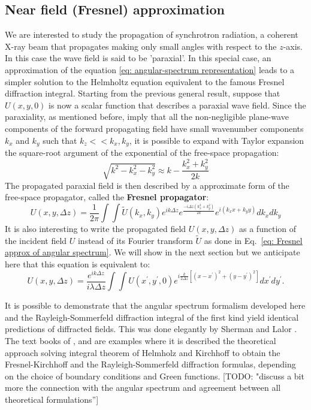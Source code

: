 \documentclass{iucr}              %
\newcommand{\todo}[1]{{\color{red}[TODO: "#1'']}}
\begin{document}
\subsection{Near field (Fresnel) approximation}

We are interested to study the propagation of synchrotron radiation, a coherent X-ray beam that propagates making only small angles with respect to the $z$-axis. In this case the wave field is said to be 'paraxial'. In this special case, an approximation of the equation \ref{eq: angular-spectrum representation} leads to a simpler solution to the Helmholtz equation equivalent to the famous Fresnel diffraction integral. Starting from the previous general result, suppose that $U(x,y,0)$ is now a scalar function that describes a paraxial wave field. Since the paraxiality, as mentioned before, imply that all the non-negligible plane-wave components of the forward propagating field have small wavenumber components $k_x$ and $k_y$ such that $k_z << k_x, k_y$, it is possible to expand with Taylor expansion the square-root argument of the exponential of the free-space propagation:
\begin{equation}\label{eq: binomial approx}
\sqrt{k^2 -k_x^2-k_y^2}\approx k -\frac{k_x^2+k_y^2}{2k}	
\end{equation}
The propagated paraxial field is then described by a approximate form of the free-space propagator, called the \textbf{Fresnel propagator}:
\begin{equation}\label{eq: Fresnel approx of angular spectrum}
U(x, y, \Delta z) = \frac {1}{ 2 \pi}\int \int \widetilde{U}(k_x, k_y) e^{i k \Delta z} e^{\frac{-i \Delta z (k_x^2 + k_y^2) }{2k}} e^{i(k_x x + k_y y)}dk_x dk_y
\end{equation}
It is also interesting to write the propagated field $U(x,y,\Delta z)$ as a function of the incident field $U$ instead of its Fourier transform $\widetilde{U}$ as done in Eq.~\ref{eq: Fresnel approx of angular spectrum}. We will show in the next section but we anticipate here that this equation is equivalent to: 
\begin{equation}\label{eq: usualfresnel}
\boxed{
U(x,y, \Delta z) = \frac {e^{i k\Delta z }}{ i \lambda \Delta z} \int  \int U(x^\prime, y^\prime, 0) e^{i \frac{k}{2 \Delta z} [(x - x^\prime)^2 + (y - y^\prime)^2]} dx^\prime dy^\prime
}.
\end{equation}

It is possible to demonstrate that the angular spectrum formalism developed here and the Rayleigh-Sommerfeld diffraction integral of the first kind yield identical predictions of diffracted fields. This was done elegantly by Sherman \cite{Sherman:67} and Lalor \cite{Lalor:68}. The text books of \cite{goldmanfourier}, \cite{nieto} and \cite{paganin_book} are examples where it is described the theoretical approach solving integral theorem of Helmholz and Kirchhoff to obtain the Fresnel-Kirchhoff and the Rayleigh-Sommerfeld diffraction formulas, depending on the choice of boundary conditions and Green functions. \todo{discuss a bit more the connection with the angular spectrum and agreement between all theoretical formulations}
\end{document}
